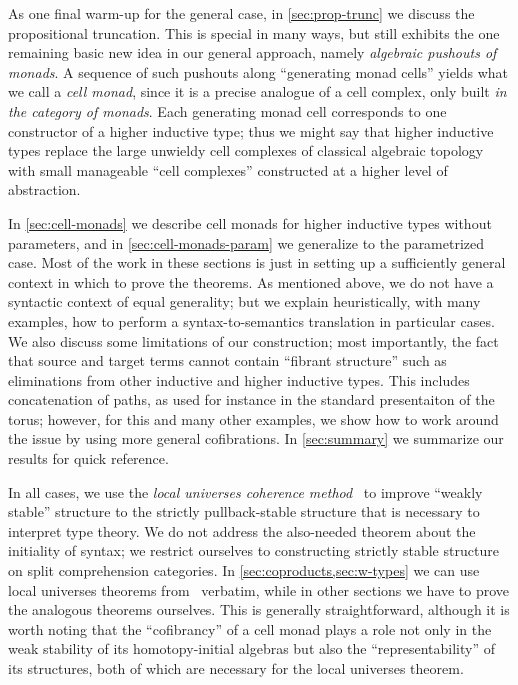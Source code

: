 \documentclass{amsart}
\begin{document}
As one final warm-up for the general case, in \cref{sec:prop-trunc} we discuss the propositional truncation.
This is special in many ways, but still exhibits the one remaining basic new idea in our general approach, namely \emph{algebraic pushouts of monads}.
A sequence of such pushouts along ``generating monad cells'' yields what we call a \emph{cell monad}, since it is a precise analogue of a cell complex, only built \emph{in the category of monads}.
Each generating monad cell corresponds to one constructor of a higher inductive type; thus we might say that higher inductive types replace the large unwieldy cell complexes of classical algebraic topology with small manageable ``cell complexes'' constructed at a higher level of abstraction.

In \cref{sec:cell-monads} we describe cell monads for higher inductive types without parameters, and in \cref{sec:cell-monads-param} we generalize to the parametrized case.
Most of the work in these sections is just in setting up a sufficiently general context in which to prove the theorems.
As mentioned above, we do not have a syntactic context of equal generality; but we explain heuristically, with many examples, how to perform a syntax-to-semantics translation in particular cases.
We also discuss some limitations of our construction; most importantly, the fact that source and target terms cannot contain ``fibrant structure'' such as eliminations from other inductive and higher inductive types.
This includes concatenation of paths, as used for instance in the standard presentaiton of the torus; however, for this and many other examples, we show how to work around the issue by using more general cofibrations.
In \cref{sec:summary} we summarize our results for quick reference.

In all cases, we use the \emph{local universes coherence method}~\cite{lw:localuniv} to improve ``weakly stable'' structure to the strictly pullback-stable structure that is necessary to interpret type theory.
We do not address the also-needed theorem about the initiality of syntax; we restrict ourselves to constructing strictly stable structure on split comprehension categories.
In \cref{sec:coproducts,sec:w-types} we can use local universes theorems from~\cite{lw:localuniv} verbatim, while in other sections we have to prove the analogous theorems ourselves.
This is generally straightforward, although it is worth noting that the ``cofibrancy'' of a cell monad plays a role not only in the weak stability of its homotopy-initial algebras but also the ``representability'' of its structures, both of which are necessary for the local universes theorem.
\end{document}
